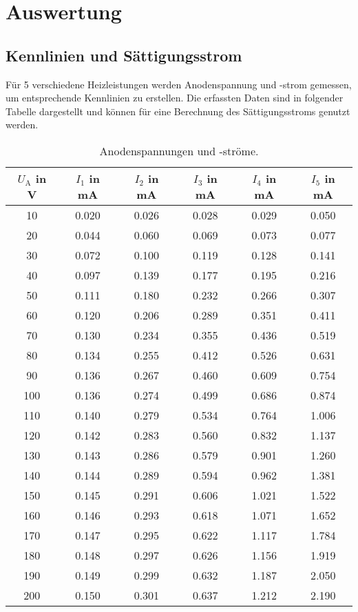 \section{Auswertung}
\label{sec:Auswertung}

\subsection{Kennlinien und Sättigungsstrom}
\label{sec:str}

Für 5 verschiedene Heizleistungen werden Anodenspannung und -strom gemessen, um entsprechende Kennlinien zu erstellen.
Die erfassten Daten sind in folgender Tabelle dargestellt und können für eine Berechnung des Sättigungsstroms genutzt werden.
\begin{table}
\centering
\caption{Anodenspannungen und -ströme.}
\label{tab:messwerte}
\begin{tabular}{c c c c c c}
\toprule
$U_\text{A}$ in V & $I_1$ in mA & $I_2$ in mA & $I_3$ in mA & $I_4$ in mA & $I_5$ in mA \\
\midrule
10  & 0.020 & 0.026 & 0.028 & 0.029 & 0.050 \\
20  & 0.044 & 0.060 & 0.069 & 0.073 & 0.077 \\
30  & 0.072 & 0.100 & 0.119 & 0.128 & 0.141 \\
40  & 0.097 & 0.139 & 0.177 & 0.195 & 0.216 \\
50  & 0.111 & 0.180 & 0.232 & 0.266 & 0.307 \\
60  & 0.120 & 0.206 & 0.289 & 0.351 & 0.411 \\
70  & 0.130 & 0.234 & 0.355 & 0.436 & 0.519 \\
80  & 0.134 & 0.255 & 0.412 & 0.526 & 0.631 \\
90  & 0.136 & 0.267 & 0.460 & 0.609 & 0.754 \\
100 & 0.136 & 0.274 & 0.499 & 0.686 & 0.874 \\
110 & 0.140 & 0.279 & 0.534 & 0.764 & 1.006 \\
120 & 0.142 & 0.283 & 0.560 & 0.832 & 1.137 \\
130 & 0.143 & 0.286 & 0.579 & 0.901 & 1.260 \\
140 & 0.144 & 0.289 & 0.594 & 0.962 & 1.381 \\
150 & 0.145 & 0.291 & 0.606 & 1.021 & 1.522 \\
160 & 0.146 & 0.293 & 0.618 & 1.071 & 1.652 \\
170 & 0.147 & 0.295 & 0.622 & 1.117 & 1.784 \\
180 & 0.148 & 0.297 & 0.626 & 1.156 & 1.919 \\
190 & 0.149 & 0.299 & 0.632 & 1.187 & 2.050 \\
200 & 0.150 & 0.301 & 0.637 & 1.212 & 2.190 \\
\bottomrule
\end{tabular}
\end{table}
